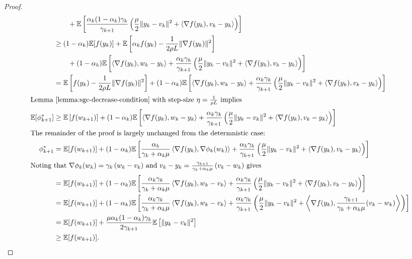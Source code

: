 \begin{proof}
\begin{align*}
        & \quad \quad+ \mathbb{E}\left[\frac{\alpha_k(1-\alpha_k)\gamma_k}{\gamma_{k+1}}\left(\frac{\mu}{2} \|y_k - v_k\|^2 + \left\langle\nabla f(y_k), v_k - y_k\right\rangle\right)\right] \\
        &\geq  (1-\alpha_k) \mathbb{E}[f(y_k)] + \mathbb{E}\left[\alpha_k f(y_k) - \frac{1}{2\rho L} \|\nabla f(y_k)\|^2\right] \\
        & \quad \quad + (1-\alpha_k) \mathbb{E}\left[\left\langle\nabla f(y_k), w_k - y_k\right\rangle + \frac{\alpha_k\gamma_k}{\gamma_{k+1}}\left(\frac{\mu}{2} \|y_k - v_k\|^2 + \left\langle\nabla f(y_k), v_k - y_k\right\rangle\right)\right] \\
        &=  \mathbb{E}\left[f(y_k) - \frac{1}{2\rho L} \|\nabla f(y_k)\|^2\right] + (1-\alpha_k) \mathbb{E}\left[\left\langle\nabla f(y_k), w_k - y_k\right\rangle + \frac{\alpha_k\gamma_k}{\gamma_{k+1}}\left(\frac{\mu}{2} \|y_k - v_k\|^2 + \left\langle\nabla f(y_k), v_k - y_k\right\rangle\right)\right] \\
        \intertext{Lemma~\ref{lemma:sgc-decrease-condition} with step-size \( \eta = \frac{1}{\rho L} \) implies }
        \mathbb{E}[\phi_{k+1}^*] &\geq \mathbb{E}\left[f(w_{k+1})\right] + (1-\alpha_k) \mathbb{E}\left[\left\langle\nabla f(y_k), w_k - y_k\right\rangle + \frac{\alpha_k\gamma_k}{\gamma_{k+1}}\left(\frac{\mu}{2} \|y_k - v_k\|^2 + \left\langle\nabla f(y_k), v_k - y_k\right\rangle\right)\right] \\
        \intertext{The remainder of the proof is largely unchanged from the determnistic case:}
        \phi_{k+1}^*  &=  \mathbb{E}[f(w_{k+1})] + (1-\alpha_k) \mathbb{E}\left[\frac{\alpha_k}{\gamma_k + \alpha_k \mu} \left\langle\nabla f(y_k), \nabla\phi_k(w_k)\right\rangle + \frac{\alpha_k\gamma_k}{\gamma_{k+1}}\left(\frac{\mu}{2} \|y_k - v_k\|^2 + \left\langle\nabla f(y_k), v_k - y_k\right\rangle\right)\right] \\
        \intertext{Noting that \( \nabla \phi_k(w_k) = \gamma_k \left(w_k- v_k\right) \) and \( v_k - y_k= \frac{\gamma_{k+1}}{\gamma_k + \alpha_k \mu}\left(v_k - w_k\right) \) gives }
        &= \mathbb{E}[f(w_{k+1})] +(1-\alpha_k) \mathbb{E}\left[\frac{\alpha_k \gamma_k}{\gamma_k + \alpha_k \mu} \left\langle\nabla f(y_k), w_k - v_k\right\rangle + \frac{\alpha_k\gamma_k}{\gamma_{k+1}}\left(\frac{\mu}{2} \|y_k - v_k\|^2 + \left\langle\nabla f(y_k), v_k - y_k\right\rangle\right)\right] \\
        &= \mathbb{E}[f(w_{k+1})] + (1-\alpha_k) \mathbb{E}\left[\frac{\alpha_k \gamma_k}{\gamma_k + \alpha_k \mu} \left\langle\nabla f(y_k), w_k - v_k\right\rangle + \frac{\alpha_k\gamma_k}{\gamma_{k+1}}\left(\frac{\mu}{2} \|y_k - v_k\|^2 + \left\langle\nabla f(y_k), \frac{\gamma_{k+1}}{\gamma_k + \alpha_k \mu}(v_k - w_k)\right\rangle\right)\right] \\
        &= \mathbb{E}[f(w_{k+1})] + \frac{\mu \alpha_k(1-\alpha_k)\gamma_k}{2 \gamma_{k+1}} \mathbb{E}\left[\|y_k - v_k\|^2\right] \\
        &\geq \mathbb{E}[f(w_{k+1})].
    \end{align*}
\end{proof}


